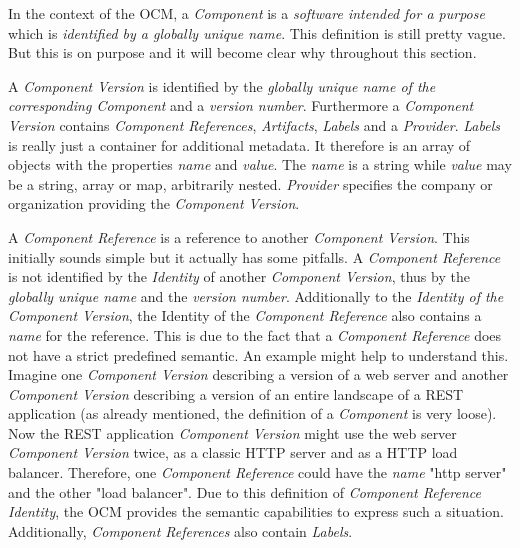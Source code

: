 \noindent In the context of the OCM, a \emph{Component} is a \emph{software intended for a purpose} which is \emph{identified by a globally unique name}. This definition is still pretty vague. But this is on purpose and it will become clear why throughout this section.\par 
\noindent A \emph{Component Version} is identified by the \emph{globally unique name of the corresponding Component} and a \emph{version number}. Furthermore a \emph{Component Version} contains \emph{Component References}, \emph{Artifacts}, \emph{Labels} and a \emph{Provider}. \emph{Labels} is really just a container for additional metadata. It therefore is an array of objects with the properties \emph{name} and \emph{value}. The \emph{name} is a string while \emph{value} may be a string, array or map, arbitrarily nested. \emph{Provider} specifies the company or organization providing the \emph{Component Version}.\par 
\noindent A \emph{Component Reference} is a reference to another \emph{Component Version}. This initially sounds simple but it actually has some pitfalls. A \emph{Component Reference} is not identified by the \emph{Identity} of another \emph{Component Version}, thus by the \emph{globally unique name} and the \emph{version number}. Additionally to the \emph{Identity of the Component Version}, the Identity of the \emph{Component Reference} also contains a \emph{name} for the reference. This is due to the fact that a \emph{Component Reference} does not have a strict predefined semantic. An example might help to understand this. Imagine one \emph{Component Version} describing a version of a web server and another \emph{Component Version} describing a version of an entire landscape of a REST application (as already mentioned, the definition of a \emph{Component} is very loose). Now the REST application \emph{Component Version} might use the web server \emph{Component Version} twice, as a classic HTTP server and as a HTTP load balancer. Therefore, one \emph{Component Reference} could have the \emph{name} "http server" and the other "load balancer". Due to this definition of \emph{Component Reference Identity}, the OCM provides the semantic capabilities to express such a situation. Additionally, \emph{Component References} also contain \emph{Labels}.\par 
